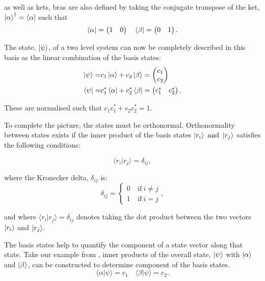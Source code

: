 as well as kets, bras are also defined by taking the conjugate transpose of the ket, $\ket{\alpha}^{\dagger} =
\bra{\alpha}$ such that
\begin{equation}
  \bra{\alpha} = \begin{pmatrix}
    1 & 0
\end{pmatrix}\quad
  \bra{\beta} = \begin{pmatrix}
  0 & 1
\end{pmatrix}.
\end{equation}

The state, $\ket{\psi}$, of a two level system can now be completely described in this basis
as the linear combination of the basis states:
\begin{align}\label{eqn:zeeman}
  \ket{\psi} =& c_1\ket{\alpha} + c_2\ket{\beta} = \begin{pmatrix}
    c_1\\
    c_2
\end{pmatrix}\\
  \bra{\psi} =& c_1^*\bra{\alpha} + c_2^*\bra{\beta} = \begin{pmatrix}
    c_1^* & c_2^*
\end{pmatrix}.
\end{align}

These are normalised such that $c_1c_1^* + c_2c_2^* = 1$.

To complete the picture, the states must be orthonormal. Orthonormality between states exists if the inner product
of the basis states $\ket{r_i} ~\text{and}~ \ket{r_j}$ satisfies the following conditions:

\begin{equation}
  \langle r_i\vert r_j\rangle = \delta_{ij},
\end{equation}

where the Kronecker delta, $\delta_{ij}$ is:
\begin{equation}
  \delta_{ij} = \begin{cases}
    0 & ~\text{if}~ i \ne j\\
    1 & ~\text{if}~ i = j
                \end{cases},
\end{equation}

and where $\langle r_i\vert r_j\rangle = \delta_{ij}$ denotes taking the dot product between the two
vectors $\ket{r_i}$ and $\ket{r_j}$.

The basis states help to quantify the component of a state vector along that state. Take our example
from , inner products of the overall state, $\ket{\psi}$ with $\ket{\alpha}$
and $\ket{\beta}$, can be constructed to determine component of the basis states.
\begin{equation}
  \langle\alpha\vert\psi\rangle = c_1 \quad \langle\beta\vert\psi\rangle = c_2.
\end{equation}

